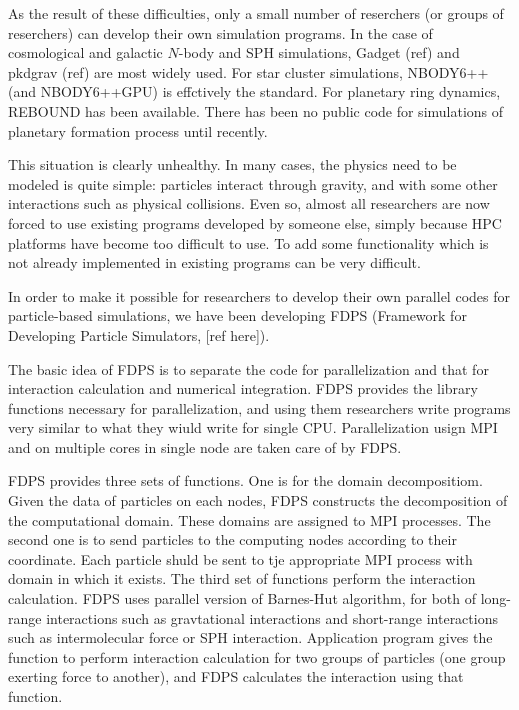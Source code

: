 \documentclass[]{pasj01}
\begin{document}
As the result of these difficulties, only a small number of reserchers
(or groups of reserchers) can develop their own simulation
programs. In the case of cosmological and galactic  $N$-body and SPH
simulations, Gadget (ref) and  pkdgrav (ref) are most widely used. For
star cluster simulations, NBODY6++ (and NBODY6++GPU) is effctively the
standard. For planetary ring dynamics, REBOUND has been
available. There has been no public code for simulations of planetary
formation process until recently.

This situation is clearly unhealthy. In many cases, the physics need
to be modeled is quite simple: particles interact through
gravity, and with some other interactions such as physical
collisions. Even so, almost all researchers are now forced to use
existing programs  developed by someone else, simply because HPC
platforms have become too difficult to use. To add some  functionality 
which is not already implemented in existing programs can be  very
difficult. 

In order to make it possible for researchers to develop their own
parallel codes for particle-based simulations, we have been developing
FDPS (Framework for Developing Particle Simulators, [ref here]).

The basic idea of FDPS is to separate the code for parallelization and
that for interaction calculation and numerical integration. FDPS
provides the library functions necessary for parallelization, and
using them researchers write programs very similar to what they wiuld
write for single CPU. Parallelization usign MPI and on multiple cores
in single node are taken care of by FDPS.

FDPS provides three sets of functions. One is for the domain
decompositiom.  Given the data of particles on each nodes, FDPS
constructs the decomposition of the computational domain. These
domains are assigned to MPI processes.  The second one is to send
particles to the computing nodes according to their coordinate. Each
particle shuld be sent to tje appropriate MPI process with domain in
which it exists. The third set of functions perform the interaction
calculation. FDPS uses parallel version of Barnes-Hut algorithm, for
both of long-range interactions such as gravtational interactions and
short-range interactions such as intermolecular force or SPH
interaction. Application program gives the function to perform
interaction calculation for two groups of particles (one group
exerting force to another), and FDPS calculates the interaction using
that function.
\end{document}
